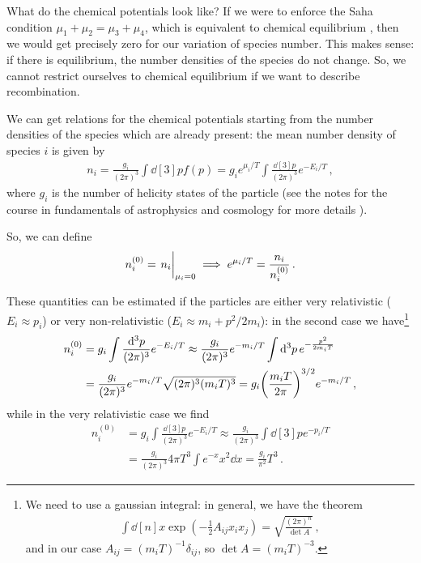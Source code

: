 \documentclass[main.tex]{subfiles}
\begin{document}
What do the chemical potentials look like?
If we were to enforce the Saha condition \(\mu_1 + \mu_2 = \mu_3 + \mu_4 \), which is equivalent to chemical equilibrium , then we would get precisely zero for our variation of species number.
This makes sense: if there is equilibrium, the number densities of the species do not change.
So, we cannot restrict ourselves to chemical equilibrium if we want to describe recombination. 

We can get relations for the chemical potentials starting from the number densities of the species which are already present:
the mean number density of species \(i\) is given by 
%
\begin{align}
n_i = \frac{g_i}{(2\pi)^3} \int \dd[3]{p} f(p)
= g_i e^{\mu_{i} / T} \int \frac{ \dd[3]{p} }{(2 \pi )^3} e^{-E_i / T}
\,,
\end{align}
%
where \(g_i\) is the number of helicity states of the particle (see the notes for the course in fundamentals of astrophysics and cosmology for more details \cite[]{tissinoFundamentalsAstrophysicsCosmology2020}). 

So, we can define 
%
\begin{align}
n_{i}^{(0)} = \eval{n_{i}}_{\mu_{i} = 0 }
\implies 
e^{\mu_i / T} = \frac{n_i}{n_i^{(0)}}
\,.
\end{align}

These quantities can be estimated if the particles are either very relativistic (\(E_i \approx p_i\)) or very non-relativistic (\(E_i \approx m_i + p^2 / 2 m_i\)): in the second case we have\footnote{We need to use a gaussian integral: in general, we have the theorem 
%
\begin{align}
\int \dd[n]{x} \exp(- \frac{1}{2} A_{ij} x_{i} x_{j}) = \sqrt{\frac{(2\pi )^{n}}{\det A}}
\,,
\end{align}
%
and in our case \(A_{ij} =  (m_i T)^{-1} \delta_{ij}\), so \(\det A = (m_i T)^{-3}\).
}
%
\begin{subequations}
\begin{align}
n_{i}^{(0)}  
&= g_i \int \frac{ \dd[3]{p}}{(2 \pi)^3} e^{-E_i / T}
\approx \frac{g_i}{(2 \pi)^3} e^{-m_i / T} \int \dd[3]{p} e^{- \frac{p^2}{2m_i T}} \\
&= \frac{g_i}{(2 \pi)^3} e^{-m_i / T} \sqrt{(2 \pi)^3 (m_i T)^3}  
= g_i \qty(\frac{m_i T}{2 \pi })^{3/2} e^{-m_i / T}
\,,
\end{align}
\end{subequations}
%
while in the very relativistic case we find 
%
\begin{subequations}
\begin{align}
n_{i}^{(0)}  
&= g_i \int \frac{ \dd[3]{p}}{(2 \pi)^3} e^{-E_i / T}
\approx \frac{g_i}{(2 \pi)^3} \int \dd[3]{p} e^{- p_i / T}  \\
&= \frac{g_i}{(2\pi )^3} 4 \pi T^3 \int e^{-x} x^2 \dd{x}  
= \frac{g_i}{\pi^2} T^3
\,.
\end{align}
\end{subequations}
\end{document}
